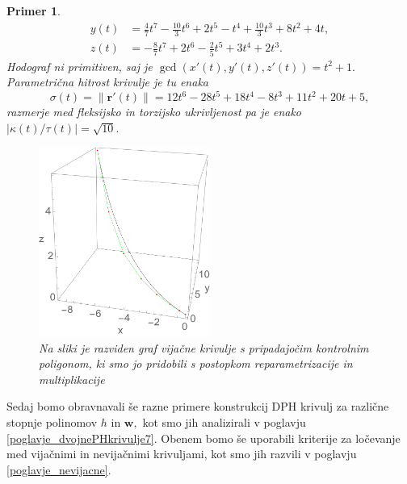 \documentclass[12pt,a4paper,twoside]{article}
\theoremstyle{definition} %
\theoremstyle{plain} %
\theoremstyle{primerstyle}
\newtheorem{primer}[definicija]{Primer}
\numberwithin{equation}{section}  %
\newcommand{\rV}{\mathbf{r}}
\newcommand{\wV}{\mathbf{w}}
\begin{document}
\begin{primer}
\begin{align*}
		y(t)&=\frac{4}{7}t^7-\frac{10}{3}t^6+2t^5-t^4+\frac{10}{3}t^3+8t^2+4t,\\
		z(t)&=-\frac{8}{7}t^7+2t^6-\frac{2}{5}t^5+3t^4+2t^3.
	\end{align*}
	Hodograf ni primitiven, saj je $\gcd(x'(t),y'(t),z'(t))=t^2+1.$ Parametrična hitrost krivulje je tu enaka
	\begin{equation*}
		\sigma(t)=\lVert\rV'(t)\rVert=12t^6-28t^5+18t^4-8t^3+11t^2+20t+5,
	\end{equation*}
	razmerje med fleksijsko in torzijsko ukrivljenost pa je enako $|\kappa(t)/\tau(t)|=\sqrt{10}.$
	\begin{figure}[h!]
	  \centering
	  \includegraphics[width=0.5\textwidth]{images/reparametrization_multi.pdf}
	  \caption[Primer vijačne krivulje, pridobljene s postopkom reparametrizacije in multiplikacije]{Na sliki je razviden graf vijačne krivulje s pripadajočim kontrolnim poligonom, ki smo jo pridobili s postopkom reparametrizacije in multiplikacije}
	  \label{fig:reparametrization_multi}
	\end{figure}
\end{primer}

Sedaj bomo obravnavali še razne primere konstrukcij DPH krivulj za različne stopnje polinomov $h$ in $\wV,$ kot smo jih analizirali v poglavju \ref{poglavje_dvojnePHkrivulje7}. Obenem bomo še uporabili kriterije za ločevanje med vijačnimi in nevijačnimi krivuljami, kot smo jih razvili v poglavju \ref{poglavje_nevijacne}.
\end{document}
